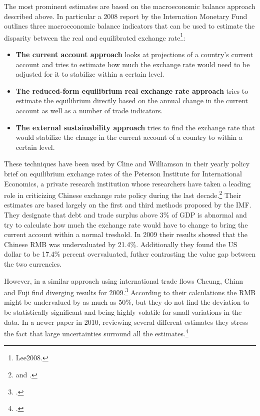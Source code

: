 The most prominent estimates are based on the macroeconomic balance approach described above. In particular a 2008 report by the 
Internation Monetary Fund outlines three macroeconomic balance indicators that can be used to 
estimate the disparity between the real and equilibrated exchange 
rate\footnote{\cite{pp. 1}{Lee2008}.}:

\begin{itemize}
	\item{\textbf{The current account approach} looks at projections of 
		a country's current account and tries to estimate how much the 
	exchange rate would need to be adjusted for it to stabilize within a 
certain level.}
\item{\textbf{The reduced-form equilibrium real exchange rate approach}
	tries to estimate the equilibrium directly based on the annual 
change in the current account as well as a number of trade indicators.}
\item{\textbf{The external sustainability approach} tries to find the 
	exchange rate that would stabilize the change in the current account 
of a country to within a certain level.}
\end{itemize}

These techniques have been used by Cline and Williamson in 
their yearly policy brief on equilibrium exchange rates of the Peterson 
Institute for International Economics, a private research institution 
whose researchers have taken a leading role in criticizing Chinese 
exchange rate policy during the last decade.\footnote{\cite{Cline2009} 
and \cite{Cline2012}.} Their estimates are based largely on the first 
and third methods proposed by the IMF. They designate that debt and 
trade surplus above 3\% of GDP is abnormal and try to calculate how much 
the exchange rate would have to change to bring the current account 
within a normal treshold. In 2009 their results showed that the Chinese 
RMB was undervaluated by 21.4\%.  Additionally they found the US dollar 
to be 17.4\% percent overvaluated, futher contrasting the value gap 
between the two currencies.

However, in a similar approach using international trade flows Cheung, 
Chinn and Fuji find diverging results for 
2009.\footnote{\cite{Cheung2009}.} According to their calculations the 
RMB might be undervalued by as much as 50\%, but they do not find the 
deviation to be statistically significant and being highly volatile for 
small variations in the data. In a newer paper in 2010, reviewing 
several different estimates they stress the fact that large 
uncertainties surround all the estimates.\footnote{\cite{Cheung2010}.}

